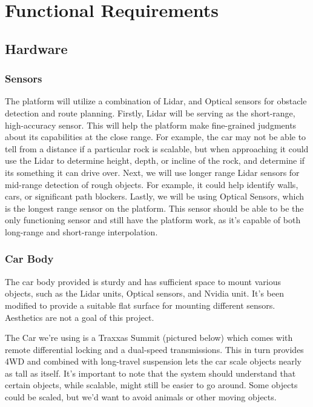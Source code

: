\documentclass[onecolumn, draftclsnofoot,10pt]{IEEEtran}
\begin{document}
\section{Functional Requirements}

\bigskip

\subsection{Hardware}

\bigskip

\subsubsection{Sensors}
    The platform will utilize a combination of Lidar, and Optical sensors for obstacle detection and route planning. Firstly, Lidar will be serving as the short-range, high-accuracy sensor. This will help the platform make fine-grained judgments about its capabilities at the close range. For example, the car may not be able to tell from a distance if a particular rock is scalable, but when approaching it could use the Lidar to determine height, depth, or incline of the rock, and determine if its something it can drive over. Next, we will use longer range Lidar sensors for mid-range detection of rough objects. For example, it could help identify walls, cars, or significant path blockers.  Lastly, we will be using Optical Sensors, which is the longest range sensor on the platform. This sensor should be able to be the only functioning sensor and still have the platform work, as it’s capable of both long-range and short-range interpolation. 

\subsubsection{Car Body}
    The car body provided is sturdy and has sufficient space to mount various objects, such as the Lidar units, Optical sensors, and Nvidia unit. It's been modified to provide a suitable flat surface for mounting different sensors. Aesthetics are not a goal of this project.
    
    The Car we're using is a Traxxas Summit (pictured below) which comes with remote differential locking and a dual-speed transmissions. This in turn provides 4WD and combined with long-travel suspension lets the car scale objects nearly as tall as itself. It's important to note that the system should understand that certain objects, while scalable, might still be easier to go around. Some objects could be scaled, but we'd want to avoid animals or other moving objects. 
    
\end{document}
